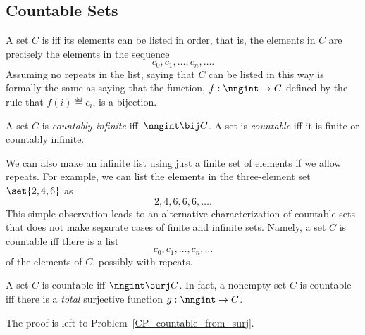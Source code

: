 \subsection{Countable Sets}\label{countable_subsec}
A set $C$ is  iff its elements can be listed in
order, that is, the elements in $C$ are precisely the elements in the
sequence
\[
c_0, c_1, \dots, c_n, \dots.
\]
Assuming no repeats in the list, saying that $C$ can be listed in this
way is formally the same as saying that the function, $f:\nngint \to
C$ defined by the rule that $f(i) \eqdef c_i$, is a bijection.

\begin{definition}
A set $C$ is \emph{countably infinite}%
 iff\  $\nngint \bij C$.  A
set is \emph{countable} iff it is finite or countably infinite.
\end{definition}

We can also make an infinite list using just a finite set of elements
if we allow repeats.  For example, we can list the elements in the
three-element set $\set{2, 4, 6}$ as
\[
2,4,6,6,6,\dots.
\]
This simple observation leads to an alternative characterization of
countable sets that does not make separate cases of finite and
infinite sets.  Namely, a set $C$ is countable iff there is a list
\[
c_0, c_1, \dots, c_n, \dots
\]
of the elements of $C$, possibly with repeats.

\begin{lemma}\label{NsurjC}
A set $C$ is countable iff $\nngint \surj C$.  In fact, a nonempty
set $C$ is countable iff there is a \emph{total} surjective function
$g:\nngint \to C$.
\end{lemma}
The proof is left to Problem~\ref{CP_countable_from_surj}.

